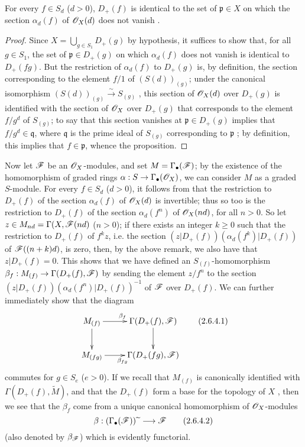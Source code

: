 \begin{proposition}[2.6.3]
\label{II.2.6.3}
For every $f\in S_d$ ($d>0$), $D_+(f)$ is identical to the set of $\mathfrak{p}\in X$ on which the section $\alpha_d(f)$ of $\mathscr{O}_X(d)$ does not vanish .
\end{proposition}

\begin{proof}
Since $X=\bigcup_{g\in S_1}D_+(g)$ by hypothesis, it suffices to show that, for all $g\in S_1$, the set of $\mathfrak{p}\in D_+(g)$ on which $\alpha_d(f)$ does not vanish is identical to $D_+(fg)$.
But the restriction of $\alpha_d(f)$ to $D_+(g)$ is, by definition, the section corresponding to the element $f/1$ of $(S(d))_{(g)}$;
under the canonical isomorphism $(S(d))_{(g)}\xrightarrow{\sim}S_{(g)}$ , this section of $\mathscr{O}_X(d)$ over $D_+(g)$ is identified with the section of $\mathscr{O}_X$ over $D_+(g)$ that corresponds to the element $f/g^d$ of $S_{(g)}$;
to say that this section vanishes at $\mathfrak{p}\in D_+(g)$ implies that $f/g^d\in\mathfrak{q}$, where $\mathfrak{q}$ is the prime ideal of $S_{(g)}$ corresponding to $\mathfrak{p}$ ;
by definition, this implies that $f\in\mathfrak{p}$, whence the proposition.
\end{proof}

\begin{env}[2.4.6]
\label{II.2.4.6}
Now let $\mathscr{F}$ be an $\mathscr{O}_X$-modules, and set $M=\Gamma_\bullet(\mathscr{F})$;
by the existence of the homomorphism of graded rings $\alpha: S\to\Gamma_\bullet(\sh{O}_X)$, we can consider $M$ as a graded $S$-module.
For every $f\in S_d$ ($d>0$), it follows from  that the restriction to $D_+(f)$ of the section $\alpha_d(f)$ of $\mathscr{O}_X(d)$ is invertible;
thus so too is the restriction to $D_+(f)$ of the section $\alpha_d(f^n)$ of $\mathscr{O}_X(nd)$, for all $n>0$.
So let $z\in M_{nd}=\Gamma(X,\mathscr{F}(nd)$ ($n>0$);
if there exists an integer $k\geq0$ such that the restriction to $D_+(f)$ of $f^kz$, i.e. the
section $(z|D_+(f))(\alpha_d(f^k)|D_+(f))$ of $\mathscr{F}((n+k)d)$, is zero, then, by the above remark, we also have that $z|D_+(f)=0$.
This shows that we have defined an $S_{(f)}$-homomorphism $\beta_f: M_{(f)}\to\Gamma(D_+(f),\sh{F})$ by sending the element $z/f^n$ to the section $(z|D_+(f))(\alpha_d(f^n)|D_+(f))^{-1}$ of $\mathscr{F}$ over $D_+(f)$.
We can further immediately show that the diagram
\[
\label{II.2.6.4.1}
  \xymatrix{
    M_{(f)} \ar[r]^{\beta_f} \ar[d]
    & \Gamma(D_+(f),\sh{F}) \ar[d]
  \\M_{(fg)} \ar[r]_{\beta_{fg}}
    & \Gamma(D_+(fg),\sh{F})
  }
\tag{2.6.4.1}
\]
commutes for $g\in S_e$ ($e>0$).
If we recall that $M_{(f)}$ is canonically identified with $\Gamma(D_+(f),\widetilde{M})$, and that the $D_+(f)$ form a base for the topology of $X$ , then we see that the $\beta_f$ come from a unique canonical homomorphism of $\mathscr{O}_X$-modules
\[
\label{II.2.6.4.2}
  \beta:(\Gamma_\bullet(\sh{F}))\supertilde\to\sh{F}
\tag{2.6.4.2}
\]
(also denoted by $\beta_{\mathscr{F}}$) which is evidently functorial.
\end{env}

